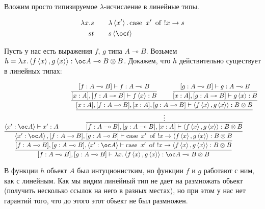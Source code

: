 Вложим просто типизируемое $\lambda$-исчисление в линейные типы.
\begin{bnf}
\begin{alignat*}{2}
	\lambda x.s & \qquad \lambda\pair{x'}.\caseb{x'}{!x \rightarrow s} \\
	st          & \qquad s\pair{\oc t}
\end{alignat*}
\end{bnf}
\begin{example}
	Пусть у нас есть выражения $f$, $g$  типа $A \multimap B$.
	Возьмем $h = \lambda x.\pair{f\pair{x}, g\pair{x}} : \oc A \multimap B \otimes B$.
	Докажем, что $h$ действительно существует в линейных типах:

	\[
		\infer[]{[f : A \multimap B], [g : A\multimap B]\vdash \lambda x.\pair{f\pair{x}, g\pair{x}} : \oc A \multimap B \otimes B}{
			\infer[]{
				[f : A \multimap B], [g : A \multimap B], \pair{x' : \oc A}
				\vdash \caseb{x'}{!x \rightarrow \pair{f\pair{x}, g\pair{x}} : B \otimes B}
			}{
				\infer[]{
					\pair{x' : \oc A}, [f : A \multimap B], [g : A \multimap B]
				\vdash \caseb{x'}{!x \rightarrow \pair{f\pair{x}, g\pair{x}} : B \otimes B}
				}{
					\pair{x' : \oc A} \vdash x' : A &&
					\infer[]{[f : A \multimap B], [g : A \multimap B], [x : A]\vdash \pair{f\pair{x}, g\pair{x}} : B \otimes B}{
						\infer[]{\vdots}{
						\infer[]{[x : A], [f : A \multimap B], [x : A], [g : A \multimap B]\vdash \pair{f\pair{x}, g\pair{x}} : B \otimes B}{
								\infer[]{[x : A], [f : A \multimap B]\vdash f\pair{x} : B}{[f : A \multimap B] \vdash f : A \multimap B}
								&&
								\infer[]{[x : A], [g : A \multimap B]\vdash g\pair{x} : B}{[g : A \multimap B] \vdash g : A \multimap B}
							}
						}
					}
				}
			}
		}
	\]

	В функции $h$ обьект $A$ был интуционистким, но функции $f$ и $g$ работают с ним, как с линейным.
	Как мы видим линейный тип не дает на размножать обьект (получить несколько ссылок на него в разных местах),
	но при этом у нас нет гарантий того, что до этого этот обьект не был размножен.
\end{example}

